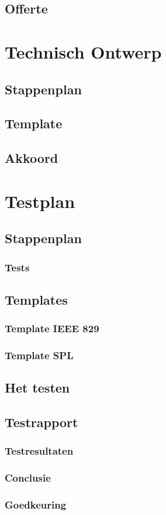 \documentclass[a4paper,12pt,twoside,openright,titlepage]{book}
\begin{document}
\section{Offerte}


\chapter{Technisch Ontwerp}

\section{Stappenplan}

\section{Template}

\section{Akkoord}


\chapter{Testplan}

\section{Stappenplan}

\subsection{Tests}

\section{Templates}
\subsection{Template IEEE 829}

\subsection{Template SPL}

\section{Het testen}

\section{Testrapport}

\subsection{Testresultaten}

\subsection{Conclusie}

\subsection{Goedkeuring}


\backmatter
\printindex
\end{document}
